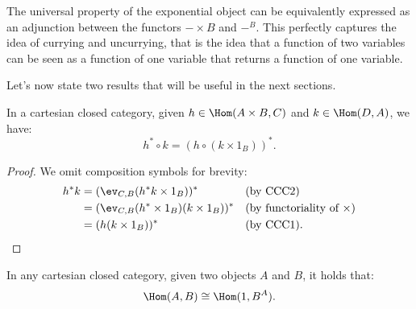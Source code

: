 \begin{remark}
    The universal property of the exponential object can be equivalently expressed as an adjunction between the functors $- \times B$ and $-^B$. This
    perfectly captures the idea of currying and uncurrying, that is the idea that a function of two variables can be seen as a function of one variable that returns a function of one variable.
\end{remark}

Let's now state two results that will be useful in the next sections.

\begin{proposition}
    In a cartesian closed category, given $h \in \Hom(A \times B, C)$ and $k \in \Hom(D, A)$, we have:
    \[ h^* \circ k = (h \circ (k \times 1_B))^*. \]
\end{proposition}

\begin{proof}
    We omit composition symbols for brevity:
    \begin{align*}
        h^* k &= (\ev_{C,B} (h^*k \times 1_B))^* &&(\textnormal{by CCC2}) \\
              &= (\ev_{C,B} (h^* \times 1_B) (k \times 1_B))^* &&(\textnormal{by functoriality of $\times$}) \\
              &= (h (k \times 1_B))^* &&(\textnormal{by CCC1}).
    \end{align*}
\end{proof}

\begin{proposition}\label{prop:morphisms-as-global-elements}
    In any cartesian closed category, given two objects $A$ and $B$, it holds that:
    \[ \Hom(A,B) \cong \Hom(1, B^A). \]
\end{proposition}


